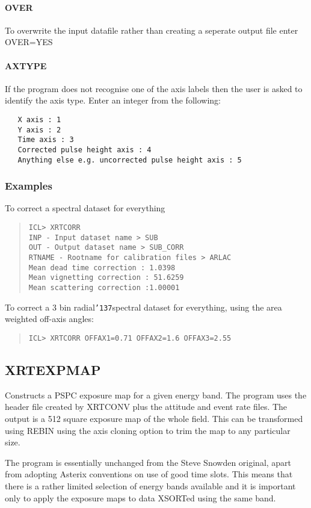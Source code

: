 \documentclass{book}
\renewcommand{\_}{{\tt\char'137}}     %
\begin{document}
\paragraph{OVER}
To overwrite the input datafile rather than creating a seperate
output file enter OVER=YES
\paragraph{AXTYPE}
If the program does not recognise one of the axis labels then the
user is asked to identify the axis type. Enter an integer from the
following:
\begin{verbatim}
   X axis : 1
   Y axis : 2
   Time axis : 3
   Corrected pulse height axis : 4
   Anything else e.g. uncorrected pulse height axis : 5
\end{verbatim}
\subsubsection{Examples}
To correct a spectral dataset for everything
\begin{quote}\begin{verbatim}
ICL> XRTCORR
INP - Input dataset name > SUB
OUT - Output dataset name > SUB_CORR
RTNAME - Rootname for calibration files > ARLAC
Mean dead time correction : 1.0398
Mean vignetting correction : 51.6259
Mean scattering correction :1.00001
\end{verbatim}\end{quote}
To correct a 3 bin radial\_spectral dataset for everything,
using the area weighted off-axis angles:
\begin{quote}\begin{verbatim}
ICL> XRTCORR OFFAX1=0.71 OFFAX2=1.6 OFFAX3=2.55
\end{verbatim}\end{quote}
\subsection{XRTEXPMAP}
Constructs a PSPC exposure map for a given energy band. The program
uses the header file created by XRTCONV plus the attitude and event
rate files. The output is a 512 square exposure map of the whole
field. This can be transformed using REBIN using the axis cloning
option to trim the map to any particular size.
 
The program is essentially unchanged from the Steve Snowden original,
apart from adopting Asterix conventions on use of good time slots.
This means that there is a rather limited selection of energy bands
available and it is important only to apply the exposure maps to data
XSORTed using the same band.
 
\end{document}
